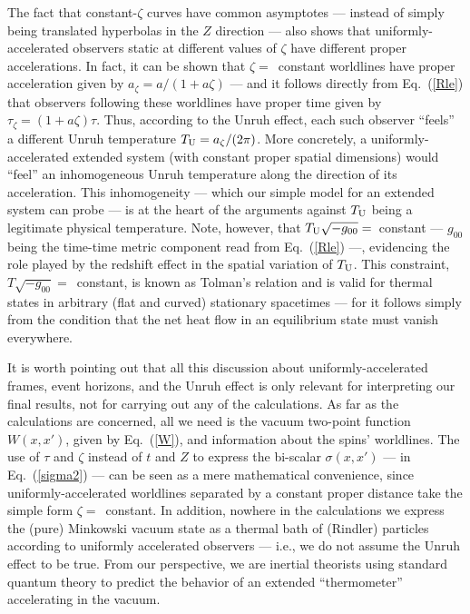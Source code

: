 \documentclass[]{nature}
\begin{document}
{The fact that constant-$\zeta$ curves have common asymptotes --- instead of simply  being translated hyperbolas in the $Z$ direction --- also shows that uniformly-accelerated observers static at
different values of  $\zeta $ have different proper accelerations. In fact, it can be shown that $\zeta =$~constant worldlines have proper acceleration given 
by ${a}_\zeta = a/(1+a\zeta)$ --- and it follows directly from Eq.~(\ref{Rle}) that observers following these worldlines have proper time given by ${\tau}_\zeta = (1+ a\zeta)\tau$.
Thus, according to the Unruh effect,
each such observer ``feels'' a different Unruh temperature 
$T_{\rm U} = {a}_\zeta/(2\pi)$. More concretely, a uniformly-accelerated extended system (with constant  proper spatial dimensions)
would ``feel'' an inhomogeneous Unruh temperature along the direction of its acceleration. This inhomogeneity --- which our simple model for an extended system can probe ---
 is at the heart of the arguments against $T_{\rm U}$ being a
legitimate 
physical temperature\cite{BV}. Note, however, that $T_{\rm U} \sqrt{-g_{00}} =$~constant --- $g_{00}$ being the time-time metric component read from Eq.~(\ref{Rle}) ---,
evidencing the role played by the redshift effect in the spatial variation of $T_{\rm U}$. This constraint, 
$T \sqrt{-g_{00}} =$~constant, is known as Tolman's relation\cite{Tolman} and is valid for thermal states in arbitrary (flat and curved) stationary spacetimes --- for
it
follows simply from the condition that the net heat flow in an equilibrium state must
vanish everywhere.

It is worth pointing out that all this discussion about uniformly-accelerated frames, event horizons, 
and the Unruh effect is only relevant for
 interpreting our final results, not for carrying out any of the calculations. As far as the calculations are concerned,
all we need is the vacuum two-point function $W(x,x')$, given by Eq.~(\ref{W}), and information about the spins' worldlines. 
The use of $\tau$ and $\zeta$ instead of 
$t$ and $Z$ to express the bi-scalar $\sigma(x,x')$ --- in Eq.~(\ref{sigma2}) ---  can be seen as a mere mathematical convenience, 
since uniformly-accelerated worldlines separated by a constant proper distance take the simple form 
$\zeta =$~constant.
In addition, nowhere in the calculations we express the (pure) Minkowski vacuum 
state as a  thermal bath of (Rindler) particles according 
to uniformly accelerated observers --- i.e., we do not  assume the Unruh effect to be true. From our perspective, we are inertial theorists using standard quantum theory to
predict the behavior of an extended ``thermometer'' accelerating in the vacuum. 



}
\end{document}
